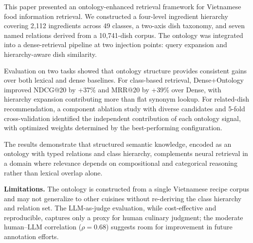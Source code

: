 \label{sec:conclusion}

This paper presented an ontology-enhanced retrieval framework for Vietnamese food information retrieval. We constructed a four-level ingredient hierarchy covering 2{,}112 ingredients across 49 classes, a two-axis dish taxonomy, and seven named relations derived from a 10{,}741-dish corpus. The ontology was integrated into a dense-retrieval pipeline at two injection points: query expansion and hierarchy-aware dish similarity.

Evaluation on two tasks showed that ontology structure provides consistent gains over both lexical and dense baselines. For class-based retrieval, Dense+Ontology improved NDCG@20 by +37\% and MRR@20 by +39\% over Dense, with hierarchy expansion contributing more than flat synonym lookup. For related-dish recommendation, a component ablation study with diverse candidates and 5-fold cross-validation identified the independent contribution of each ontology signal, with optimized weights determined by the best-performing configuration.

The results demonstrate that structured semantic knowledge, encoded as an ontology with typed relations and class hierarchy, complements neural retrieval in a domain where relevance depends on compositional and categorical reasoning rather than lexical overlap alone.

\textbf{Limitations.}
The ontology is constructed from a single Vietnamese recipe corpus and may not generalize to other cuisines without re-deriving the class hierarchy and relation set. The LLM-as-judge evaluation, while cost-effective and reproducible, captures only a proxy for human culinary judgment; the moderate human--LLM correlation ($\rho = 0.68$) suggests room for improvement in future annotation efforts.

